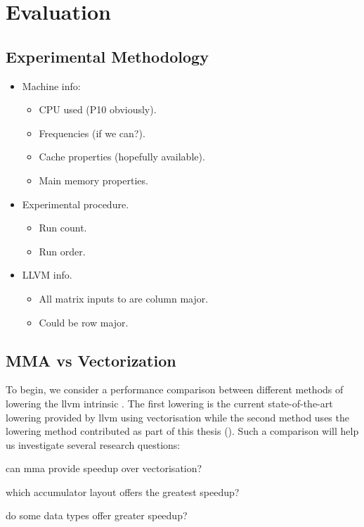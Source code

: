 \documentclass[\main/thesis.tex]{subfiles}
\begin{document}
\chapter{Evaluation}
\label{cha:evaluation}
\section{Experimental Methodology}
\begin{itemize}
  \item
    Machine info:
    \begin{itemize}
      \item CPU used (P10 obviously).
      \item Frequencies (if we can?).
      \item Cache properties (hopefully available).
      \item Main memory properties.
    \end{itemize}
  \item
    Experimental procedure.
    \begin{itemize}
      \item Run count.
      \item Run order.
    \end{itemize}
  \item
    LLVM info.
      \begin{itemize}
        \item All matrix inputs to  are column major.
        \item Could be row major.
      \end{itemize}
\end{itemize}

\section{MMA vs Vectorization}
\label{sec:mmaVsVec}
To begin, we consider a performance comparison between different methods of \gls{lowering} the \gls{llvm} intrinsic .
The first lowering is the current state-of-the-art lowering provided by \gls{llvm} using \gls{vectorisation} while the second method uses the \gls{lowering} method contributed as part of this thesis ().
Such a comparison will help us investigate several research questions:
\begin{enumerate*}[itemjoin*={{ and }}, label=\textbf{(\arabic*)}]
  \item can \gls{mma} provide speedup over \gls{vectorisation}?
  \item which accumulator layout offers the greatest speedup?
  \item do some data types offer greater speedup?
\end{enumerate*}
\end{document}
